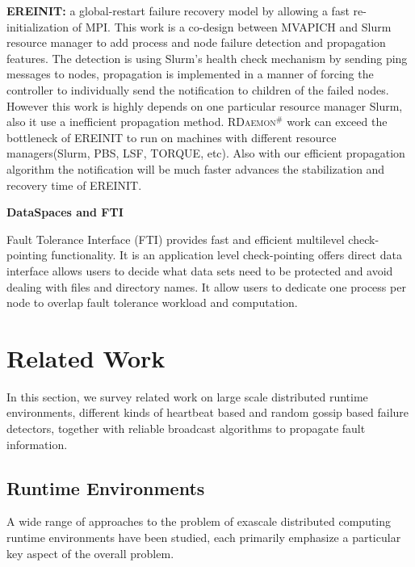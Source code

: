 \documentclass[sigconf]{acmart}
\newcommand{\mpi}[0]{\textsc{MPI}\xspace}
\newcommand{\ourwork}[0]{\textsc{RDaemon}\ensuremath{^\#}\xspace}
\begin{document}
\textbf{EREINIT:}  a global-restart failure recovery model by allowing a fast re-initialization of \mpi. This work is a co-design between MVAPICH and Slurm resource manager to add process and node failure detection and propagation features. The detection is using Slurm's health check mechanism by sending ping messages to nodes, propagation is implemented in a manner of forcing the controller to individually send the notification to children of the failed nodes. However this work is highly depends on one particular resource manager Slurm, also it use a inefficient propagation method. \ourwork work can exceed the bottleneck of EREINIT to run on machines with different resource managers(Slurm, PBS, LSF, TORQUE, etc). Also with our efficient propagation algorithm the notification will be much faster advances the stabilization and recovery time of EREINIT.

\textbf{DataSpaces and FTI} 

 Fault Tolerance Interface (FTI) provides fast and efficient multilevel check-pointing functionality. It is an application level check-pointing offers direct data interface allows users to decide what data sets need to be protected and avoid dealing with files and directory names. It allow users to dedicate one process per node to overlap fault tolerance workload and computation.
 
\section{Related Work}\label{sec:related}
In this section, we survey related work on large scale distributed runtime environments, different kinds of heartbeat based and random gossip based failure detectors, together with reliable broadcast algorithms to propagate fault information.

\subsection{Runtime Environments}
A wide range of approaches to the problem of exascale distributed computing runtime environments have been studied, each primarily emphasize a particular key aspect of the overall problem.
\end{document}
